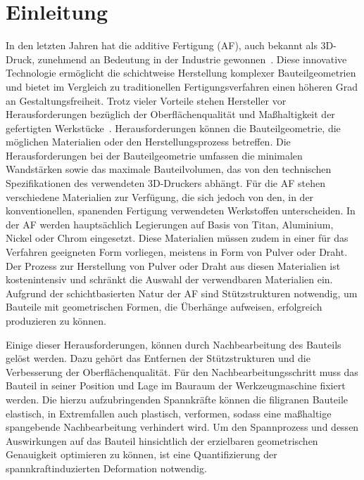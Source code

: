 \chapter{Einleitung}

In den letzten Jahren hat die additive Fertigung (AF), auch bekannt als 3D-Druck, 
zunehmend an Bedeutung in der Industrie gewonnen~\cite{JADHAV20222094}. 
Diese innovative Technologie 
ermöglicht die schichtweise Herstellung komplexer Bauteilgeometrien und bietet im 
Vergleich zu traditionellen Fertigungsverfahren einen höheren Grad an 
Gestaltungsfreiheit. Trotz vieler Vorteile stehen Hersteller vor 
Herausforderungen bezüglich der Oberflächenqualität und Maßhaltigkeit 
der gefertigten Werkstücke~\cite{SCHNECK201919}.
Herausforderungen können die Bauteilgeometrie, die möglichen Materialien oder 
den Herstellungsprozess betreffen.
Die Herausforderungen bei der Bauteilgeometrie umfassen die minimalen 
Wandstärken sowie das maximale Bauteilvolumen, das von den technischen 
Spezifikationen des verwendeten 3D-Druckers abhängt. Für die AF stehen 
verschiedene Materialien zur Verfügung, 
die sich jedoch von den, in der konventionellen, spanenden Fertigung 
verwendeten Werkstoffen unterscheiden. In der AF werden hauptsächlich Legierungen 
auf Basis von Titan, Aluminium, Nickel oder Chrom eingesetzt. Diese Materialien
müssen zudem in einer für das Verfahren geeigneten Form vorliegen, 
meistens in Form von Pulver oder Draht. Der Prozess zur Herstellung von 
Pulver oder Draht aus diesen Materialien ist kostenintensiv und schränkt
die Auswahl der verwendbaren Materialien ein. Aufgrund der 
schichtbasierten Natur der AF sind Stützstrukturen 
notwendig, um Bauteile mit geometrischen Formen, die Überhänge aufweisen, 
erfolgreich produzieren zu können. \label{drawbacks_af}
~\cite{Vranic.2017}

Einige dieser Herausforderungen, können durch Nachbearbeitung des Bauteils 
gelöst werden. Dazu gehört das Entfernen der Stützstrukturen und die Verbesserung
der Oberflächenqualität.
Für den Nachbearbeitungsschritt muss das Bauteil in seiner Position und Lage im Bauraum
der Werkzeugmaschine fixiert werden. Die hierzu aufzubringenden Spannkräfte 
können die filigranen Bauteile elastisch, in Extremfallen auch plastisch, verformen, 
sodass eine maßhaltige spangebende Nachbearbeitung verhindert wird. 
Um den Spannprozess und dessen Auswirkungen auf das Bauteil hinsichtlich 
der erzielbaren geometrischen Genauigkeit optimieren zu
können, ist eine Quantifizierung der spannkraftinduzierten Deformation notwendig.~\cite{newMethod}

